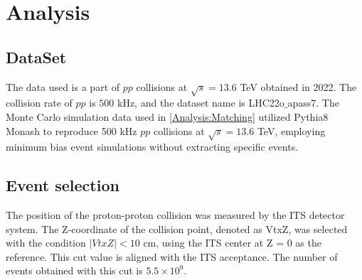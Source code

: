 \section{Analysis}
\label{Analysis}
    \subsection{DataSet}
    \label{DataSet}
        The data used is a part of $pp$ collisions at $\sqrt{s}=13.6$ TeV obtained in 2022. The collision rate of $pp$ is $500$ kHz, and the dataset name is LHC22o$\_$apass7.
        The Monte Carlo simulation data used in \ref{Analysis:Matching} utilized Pythia8 Monash to reproduce 500 kHz $pp$ collisions at $\sqrt{s}=13.6$ TeV, employing minimum bias event simulations without extracting specific events.
        
    \subsection{Event selection}
    \label{Event_selection}
        The position of the proton-proton collision was measured by the ITS detector system. The Z-coordinate of the collision point, denoted as VtxZ, was selected with the condition $|VtxZ| < 10$ cm, using the ITS center at Z = 0 as the reference. This cut value is aligned with the ITS acceptance. The number of events obtained with this cut is $5.5 \times 10^9$.\@

